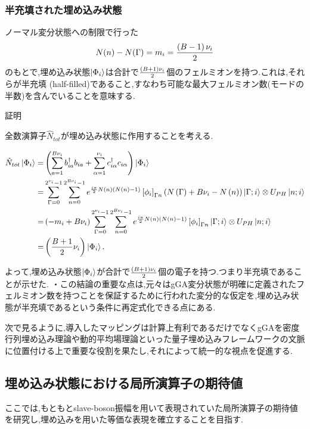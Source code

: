 \subsubsection{半充填された埋め込み状態}
ノーマル変分状態への制限で行った
\begin{equation}
    N(n)-N(\Gamma)=m_{i}=\frac{\left( B-1 \right)\nu_{i}}{2}
\end{equation}
のもとで,埋め込み状態$\ket{\Phi_{i}}$は合計で$\frac{\left( B+1 \right)\nu_{i}}{2}$個のフェルミオンを持つ.これは,それらが半充填 (half-filled)であること,すなわち可能な最大フェルミオン数(モードの半数)を含んでいることを意味する.

証明

全数演算子$\hat{N}_{tot}$が埋め込み状態に作用することを考える.

\begin{equation}
\begin{split}
  \hat{N}_{tot}\Ket{\Phi_{i}}=&\left( \sum_{a=1}^{B\nu_{i}}b^\dagger_{ia}b_{ia}+\sum_{\alpha=1}^{\nu_{i}}c^\dagger_{i\alpha}c_{i\alpha} \right)\Ket{\Phi_{i}}\\
  =&\sum_{\Gamma=0}^{2^{\nu_{i}}-1}\sum_{n=0}^{2^{B\nu_{i}}-1}e^{\frac{i\pi}{2}N\left( n \right)\left( N\left( n \right)-1 \right)}\left[ \phi_{i} \right]_{\Gamma n}\left( N\left( \Gamma \right)+B\nu_{i}-N\left( n \right) \right)\Ket{\Gamma;i}\otimes U_{PH}\Ket{n;i}\\
  =&\left( -m_{i}+B\nu_{i} \right)\sum_{\Gamma=0}^{2^{\nu_{i}}-1}\sum_{n=0}^{2^{B\nu_{i}}-1}e^{\frac{i\pi}{2}N\left( n \right)\left( N\left( n \right)-1 \right)}\left[ \phi_{i} \right]_{\Gamma n}\Ket{\Gamma;i}\otimes U_{PH}\Ket{n;i}\\
  =&\left( \frac{B+1}{2}\nu_{i} \right)\Ket{\Phi_{i}}.
\end{split}
\end{equation}

よって,埋め込み状態$\Ket{\Phi_{i}}$が合計で$\frac{\left( B+1 \right)\nu_{i}}{2}$個の電子を持つ.つまり半充填であることが示せた.
・この結論の重要な点は,元々はgGA変分状態が明確に定義されたフェルミオン数を持つことを保証するために行われた変分的な仮定を,埋め込み状態が半充填であるという条件に再定式化できる点にある.

次で見るように,導入したマッピングは計算上有利であるだけでなくgGAを密度行列埋め込み理論や動的平均場理論といった量子埋め込みフレームワークの文脈に位置付ける上で重要な役割を果たし,それによって統一的な視点を促進する.

\subsection{埋め込み状態における局所演算子の期待値}
ここでは,もともとslave-boson振幅を用いて表現されていた局所演算子の期待値を研究し,埋め込みを用いた等価な表現を確立することを目指す.

